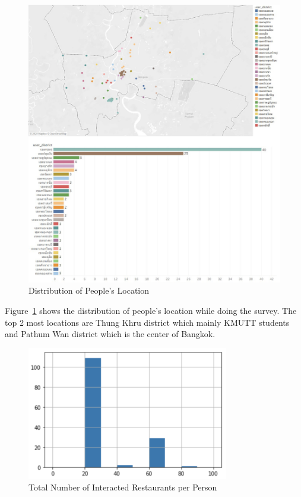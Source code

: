 \documentclass[12pt,oneside,openright,a4paper]{cpe-english-project}
\begin{document}
\begin{figure}[H]\centering
\includegraphics[width=450pt]{./images/4DistributionofPeoplesLocation.png}
\caption{Distribution of People’s Location}\label{fig:4DistributionofPeoplesLocation}
\end{figure}

Figure~\ref{fig:4DistributionofPeoplesLocation} shows the distribution of people’s location while doing the survey. The top 2 most locations are Thung Khru district which mainly KMUTT students and Pathum Wan district which is the center of Bangkok.

\begin{figure}[H]\centering
\includegraphics[width=250pt]{./images/4TotalNumberofInteractedRestaurantsperPerson.png}
\caption{Total Number of Interacted Restaurants per Person}\label{fig:4TotalNumberofInteractedRestaurantsperPerson}
\end{figure}
\end{document}

